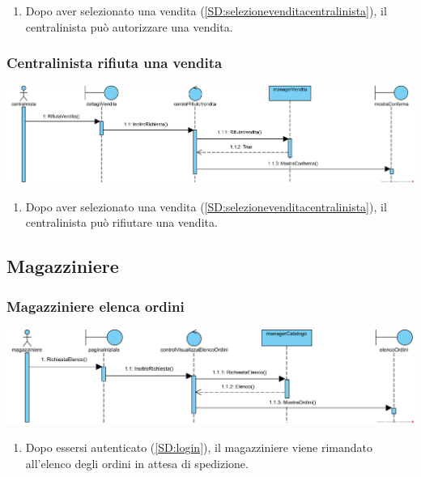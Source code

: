 \documentclass[12pt,a4paper]{article}
\begin{document}
\begin{enumerate}
\item Dopo aver selezionato una vendita (\ref{SD:selezionevenditacentralinista}), il centralinista può autorizzare una vendita.
\end{enumerate}

\subsubsection{Centralinista rifiuta una vendita}
\label{SD:centralinistaautorizza}
\begin{center}
\includegraphics[width=\textwidth]{SequenceDiagram/CentralinistaVenditaRifiuta}
\end{center}

\begin{enumerate}
\item Dopo aver selezionato una vendita (\ref{SD:selezionevenditacentralinista}), il centralinista può rifiutare una vendita.
\end{enumerate}

\newpage

\subsection{Magazziniere}
\subsubsection{Magazziniere elenca ordini}
\label{SD:magazzinierevisualizzaelenco}
\begin{center}
\includegraphics[width=\textwidth]{SequenceDiagram/MagazziniereElencoVisualizza}
\end{center}

\begin{enumerate}
\item Dopo essersi autenticato (\ref{SD:login}), il magazziniere viene rimandato all'elenco degli ordini in attesa di spedizione.
\end{enumerate}
\end{document}
